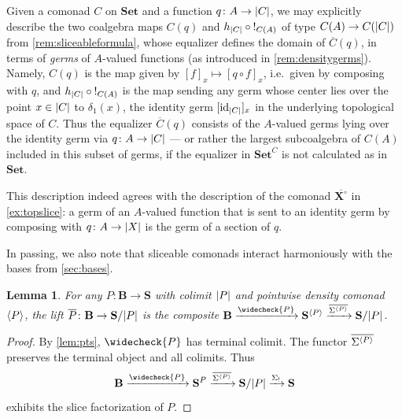 \documentclass[11pt, oneside, article]{memoir}
\theoremstyle{plain}
\newtheorem{lemma}[theorem]{Lemma}
\theoremstyle{definition}
\theoremstyle{remark}
\newenvironment{remark}
{\renewcommand\qedsymbol{$\lrcorner$}%
  \pushQED{\qed}\myremark}
{\popQED\endmyremark}
\DeclareMathOperator{\id}{id}
\DeclarePairedDelimiter{\gen}{\langle}{\rangle}
\DeclarePairedDelimiter{\abs}{\lvert}{\rvert}
\newcommand{\xto}[1]{\xrightarrow{#1}}
\newcommand{\bang}{\mathrm{!}}
\newcommand{\namedcat}[1]{\mathbf{#1}}
\newcommand{\cat}[1]{\mathbf{#1}}
\newcommand{\spa}[1]{\mathbf{#1}}
\newcommand{\Set}{\namedcat{Set}}
\newcommand{\CoalgOn}[2]{{#2}^{#1}}
\newcommand{\CoalgSet}[1]{\CoalgOn{#1}{\Set}}
\newcommand{\CoalgS}[1]{\CoalgOn{#1}{\bS}}
\newcommand{\clift}[1]{\overline{#1}}
\newcommand{\pts}[1]{{\abs{#1}}}
\newcommand{\lift}[1]{\widecheck{#1}}
\newcommand{\ptlift}[1]{\overline{#1}}
\newcommand{\carr}{\Sigma}
\newcommand{\slicel}{\Sigma_\bang}
\newcommand{\car}[1]{\carr^{#1}}
\newcommand{\carP}{\car{\cP}}
\newcommand{\ph}[1]{#1}
\newcommand{\cmnd}[1]{{#1}}
\newcommand{\xA}{A}
\newcommand{\xX}{X}
\newcommand{\hH}{h}
\newcommand{\cC}{\cmnd{C}}
\newcommand{\bB}{\cat{B}}
\newcommand{\bS}{\cat{S}}
\newcommand{\pP}{\ph{P}}
\newcommand{\cP}{\gen{\pP}}
\newcommand{\lP}{\lift{\pP}}
\newcommand{\tX}{\spa{X}}
\newcommand{\cX}{\toptocmd{\tX}}
\newcommand{\CSet}{\CoalgSet{\cC}}
\newcommand{\PS}{\CoalgS{\cP}}
\newcommand{\SetP}{\Set/\pts{\pP}}
\newcommand{\toptocmd}[1]{{{#1}^\circ}}
\begin{document}
\begin{remark}\label{rem:setsliceformula}
  Given a comonad $\cC$ on $\Set$ and a function
  $q \colon \xA \to \pts{\cC}$, we may explicitly describe the two
  coalgebra maps $\cC(q)$ and $\hH_{\pts{\cC}}\circ \bang_{\cC(\xA)}$
  of type $\cC(\xA) \to \cC(\pts{\cC})$ from
  \cref{rem:sliceableformula}, whose equalizer defines the domain of
  $\clift{\cC}(q)$, in terms of \emph{germs} of $\xA$-valued functions
  (as introduced in \cref{rem:densitygerms}). Namely, $\cC(q)$ is the map
  given by $[f]_x \mapsto [q \circ f]_x$, i.e.\ given by composing
  with $q$, and $\hH_{\pts{\cC}}\circ \bang_{\cC(\xA)}$ is the map
  sending any germ whose center lies over the point $x \in \pts{\cC}$
  to $\delta_1(x)$, the identity germ $[\id_{\pts{\cC}}]_x$ in the
  underlying topological space of $\cC$. Thus the equalizer
  $\clift{\cC}(q)$ consists of the $\xA$-valued germs lying over the
  identity germ via $q \colon \xA \to \pts{\cC}$ --- or rather the
  largest subcoalgebra of $\cC(\xA)$ included in this subset of germs,
  if the equalizer in $\CSet$ is not calculated as in $\Set$.

  This description indeed agrees with the description of the comonad
  $\clift{\cX}$ in \cref{ex:topslice}: a germ of an $\xA$-valued
  function that is sent to an identity germ by composing with
  $q \colon \xA \to \pts{\xX}$ is the germ of a section of $q$.
\end{remark}

In passing, we also note that sliceable comonads interact harmoniously
with the bases from \cref{sec:bases}.


\begin{lemma}\label{lem:liftcompatibility}
  For any $\pP \colon \bB \to \bS$ with colimit $\pts{\pP}$ and pointwise
  density comonad $\cP$, the lift
  $\ptlift{\pP} \colon \bB \to \bS/\pts{\pP}$ is the composite
  $\bB \xto{\lP} \PS \xto{\ptlift{\carP}}
  \bS/\pts{\pP}$.
\end{lemma}
\begin{proof}
  By \cref{lem:pts}, $\lP$ has terminal colimit. The functor
  $\ptlift{\carP}$ preserves the terminal object and all
  colimits. Thus
  \[\bB \xto{\lP} \CoalgS{\pP}
    \xto{\ptlift{\carP}} \bS/\pts{\pP} \xto{\slicel} \bS\]
  exhibits the slice factorization of $\pP$.
\end{proof}
\end{document}
